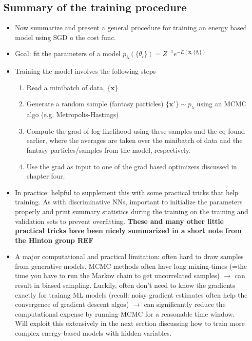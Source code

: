 \documentclass[norsk,a4paper,11pt]{article}
\begin{document}
\subsection{Summary of the training procedure}
\begin{itemize}
	\item Now summarize and present a general procedure for training an energy based model using SGD o the cost func.
	\item Goal: fit the parameters of a model 
	$p_\lambda (\{ \theta_i \}) = Z^{-1} e^{- E(\bm{x}, \{ \theta_i \})}$
	\item Training the model involves the following steps
	\begin{enumerate}
		\item Read a minibatch of data, $\{ \bm{x} \}$
		\item Generate a random sample (fantasy particles)
		$\{ \bm{x}' \} \sim p_\lambda$ using an MCMC algo (e.g. Metropolis-Hastings)
		\item Compute the grad of log-likelihood using these samples and the eq found earlier, where the averages are taken over the minibatch of data and the fantasy particles/samples from the model, respectively.
		\item Use the grad as input to one of the grad based optimizers discussed in chapter four.
	\end{enumerate}
	\item In practice: helpful to supplement this with some practical tricks that help training. As with discriminative NNs, important to initialize the parameters properly and print summary statistics during the training on the training and validation sets to prevent overfitting. \textbf{These and many other little practical tricks have been nicely summarized in a short note from the Hinton group REF}
	\item A major computational and practical limitation: often hard to draw samples from generative models. MCMC methods often have long mixing-times (=the time you have to run the Markov chain to get uncorrelated samples) $\rightarrow$ can result in biased sampling. Luckily, often don't need to know the gradients exactly for trainng ML models (recall: noisy gradient estimates often help the convergence of gradient descent algos) $\rightarrow$ can significantly reduce the computational expense by running MCMC for a reasonable time window. Will exploit this extensively in the next section discussing how to train more complex energy-based models with hidden variables.
\end{itemize}
\end{document}
